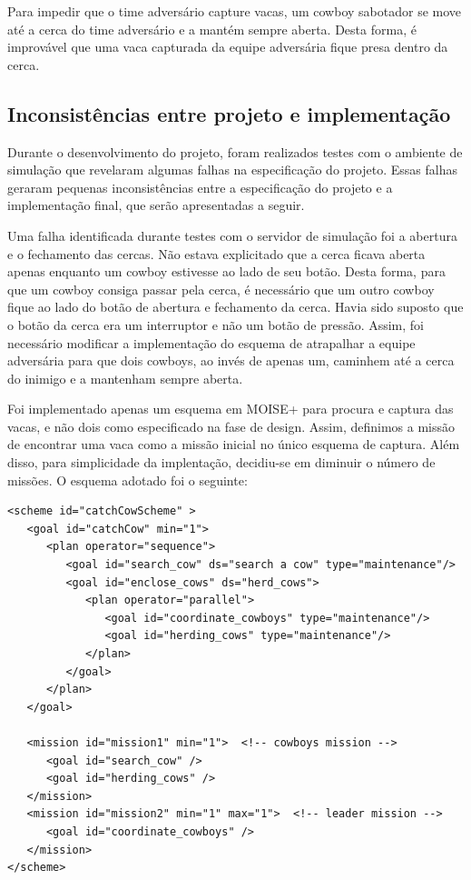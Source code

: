 \documentclass{llncs}
\begin{document}
Para impedir que o time adversário capture vacas, um cowboy sabotador se move até a cerca do time adversário e a mantém sempre aberta. Desta forma, é improvável que uma vaca capturada da equipe adversária fique presa dentro da cerca.


\subsection{Inconsistências entre projeto e implementação}

Durante o desenvolvimento do projeto, foram realizados testes com o ambiente de simulação que revelaram algumas falhas na especificação do projeto. Essas falhas geraram pequenas inconsistências entre a especificação do projeto e a implementação final, que serão apresentadas a seguir.

Uma falha identificada durante testes com o servidor de simulação foi a abertura e o fechamento das cercas. Não estava explicitado que a cerca ficava aberta apenas enquanto um cowboy estivesse ao lado de seu botão. Desta forma, para que um cowboy consiga passar pela cerca, é necessário que um outro cowboy fique ao lado do botão de abertura e fechamento da cerca. Havia sido suposto que o botão da cerca era um interruptor e não um botão de pressão. Assim, foi necessário modificar a implementação do esquema de atrapalhar a equipe adversária para que dois cowboys, ao invés de apenas um, caminhem até a cerca do inimigo e a mantenham sempre aberta.

Foi implementado apenas um esquema em MOISE+ para procura e captura das vacas, e não dois como especificado na fase de design. Assim, definimos a missão de encontrar uma vaca como a missão inicial no único esquema de captura. Além disso, para simplicidade da implentação, decidiu-se em diminuir o número de missões. O esquema adotado foi o seguinte:


\begin{lstlisting}
<scheme id="catchCowScheme" >
   <goal id="catchCow" min="1">
      <plan operator="sequence">
         <goal id="search_cow" ds="search a cow" type="maintenance"/>
         <goal id="enclose_cows" ds="herd_cows">
            <plan operator="parallel">
               <goal id="coordinate_cowboys" type="maintenance"/>
               <goal id="herding_cows" type="maintenance"/>		
            </plan>
         </goal> 
      </plan>
   </goal>
			
   <mission id="mission1" min="1">  <!-- cowboys mission -->
      <goal id="search_cow" />
      <goal id="herding_cows" />
   </mission>
   <mission id="mission2" min="1" max="1">  <!-- leader mission -->
      <goal id="coordinate_cowboys" />
   </mission>
</scheme>
\end{lstlisting}
\end{document}
